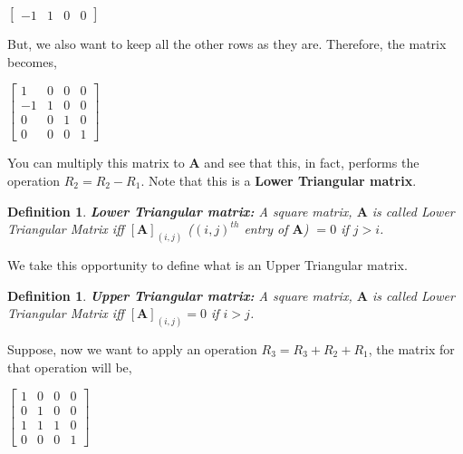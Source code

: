 \documentclass[a4paper]{article}
\newtheorem{definition}[theorem]{Definition}
\begin{document}
            \begin{center}
                $
                \begin{bmatrix}
                    -1 & 1 & 0 & 0 
                \end{bmatrix}
                $
            \end{center}
            
            But, we also want to keep all the other rows as they are. Therefore, the matrix becomes,
            
            \begin{center}
                $
                    \begin{bmatrix}
                    1  & 0 & 0 & 0 \\
                    -1 & 1 & 0 & 0 \\
                    0  & 0 & 1 & 0 \\
                    0  & 0 & 0 & 1 
                    \end{bmatrix}
                $
            \end{center}
            
            You can multiply this matrix to $\mathbf{A}$ and see that this, in fact, performs the operation $R_2 = R_2 - R_1$. Note that this is a \textbf{Lower Triangular matrix}.
            \begin{definition}
                \textbf{Lower Triangular matrix: } A square matrix, $\mathbf{A}$ is called Lower Triangular Matrix iff $[\mathbf{A}]_{(i,j)}$ ($(i,j)^{th}$ entry of $\mathbf{A}$) $ = 0$ if $j>i$. 
            \end{definition}
            
            We take this opportunity to define what is an Upper Triangular matrix.
            \begin{definition}
                \textbf{Upper Triangular matrix: } A square matrix, $\mathbf{A}$ is called Lower Triangular Matrix iff $[\mathbf{A}]_{(i,j)} = 0$ if $i>j$. 
            \end{definition}
            
            \newpage
            
            Suppose, now we want to apply an operation $R_3 = R_3 + R_2 + R_1$, the matrix for that operation will be,
            
            \begin{center}
                $
                    \begin{bmatrix}
                    1  & 0 & 0 & 0 \\
                    0  & 1 & 0 & 0 \\
                    1  & 1 & 1 & 0 \\
                    0  & 0 & 0 & 1 
                    \end{bmatrix}
                $
            \end{center}
            
\end{document}
